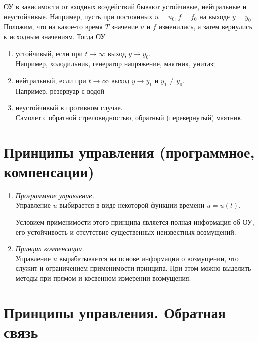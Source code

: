 \documentclass[../TAU.tex]{subfiles}
\theoremstyle{plain}
\theoremstyle{definition}
\theoremstyle{remark}
\theoremstyle{plain}
\begin{document}
ОУ в зависимости от входных воздействий бывают устойчивые, нейтральные и неустойчивые. Например, пусть при постоянных $u = u_0, f = f_0$ на выходе $y = y_0$. Положим, что на какое-то время $T$ значение $u$ и $f$ изменились, а затем вернулись к исходным значениям. Тогда ОУ
\begin{enumerate}
\item устойчивый, если при $t \rightarrow \infty$ выход $y \rightarrow y_0$. \\
Например, холодильник, генератор напряжение, маятник, унитаз;\\
\item нейтральный, если при $t \rightarrow \infty$ выход $y \rightarrow y_1$ и $y_1\neq y_0$. \\
Например, резервуар с водой\\
\item неустойчивый в противном случае.\\
Самолет с обратной стреловидностью, обратный (перевернутый) маятник.
\end{enumerate}




\section{Принципы управления (программное, компенсации)}

\begin{enumerate}
\item {\it Программное управление.}\\
Управление $u$ выбирается в виде некоторой функции времени $u = u(t)$.
\begin{center}
\end{center}
Условием применимости этого принципа является полная информация об ОУ, его устойчивость и отсутствие существенных неизвестных возмущений.
\item {\it Принцип компенсации.}\\
Управление $u$ вырабатывается на основе информации о возмущении, что служит и ограничением применимости принципа. При этом можно выделить методы при прямом и косвенном измерении возмущения.

\end{enumerate}




\section{Принципы управления. Обратная связь}
\end{document}
